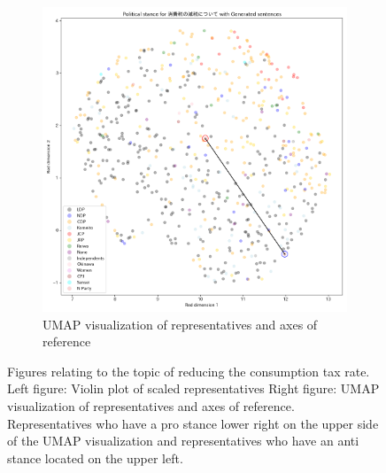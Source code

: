 \documentclass[final,5p,times,twocolumn,authoryear]{elsarticle}
\begin{document}
\begin{figure}[h]
\begin{subfigure}{0.22\textwidth}
      \includegraphics[width=1\linewidth]{figs/results/economy/consumptiontax_umap_gen.png}
      \caption{UMAP visualization of representatives and axes of reference}
    \end{subfigure}
\caption{Figures relating to the topic of reducing the consumption tax rate. Left figure: Violin plot of scaled representatives Right figure: UMAP visualization of representatives and axes of reference. Representatives who have a pro stance lower right on the upper side of the UMAP visualization and representatives who have an anti stance located on the upper left.}
\label{fig: results-economy-consumption-tax-rate}
\end{figure}
\end{document}
